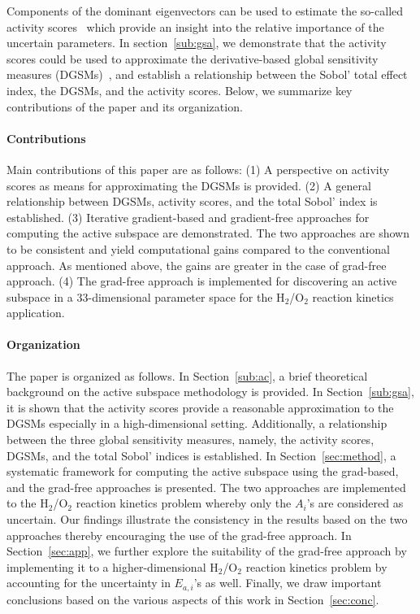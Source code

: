 Components of the dominant eigenvectors can be used to estimate the so-called 
activity scores~\cite{Diaz:2016,Constantine:2017} which provide an insight into the relative importance
of the uncertain parameters. In 
section~\ref{sub:gsa}, we demonstrate that the activity scores could be used to approximate the 
derivative-based global sensitivity measures (DGSMs)~\cite{Sobol:2009}, and establish a relationship between
the Sobol' total effect index, the DGSMs, and the activity scores. Below, we summarize key contributions of
the paper and its organization. 

\paragraph{Contributions}
Main contributions of this paper are as follows: (1) A perspective on activity scores as means for approximating
the DGSMs is provided. (2) A general relationship between DGSMs, activity scores, and the total Sobol' index 
is established. (3) Iterative gradient-based and gradient-free approaches for computing the active subspace are
 demonstrated. The two approaches are shown to be consistent and yield computational gains compared to the 
 conventional approach. As mentioned above, the gains are greater in the case of grad-free approach. (4) The
 grad-free approach is implemented for discovering an active subspace in a 33-dimensional parameter space 
 for the H$_2$/O$_2$ reaction kinetics application. 
 
 \paragraph{Organization}
 The paper is organized as follows. In Section~\ref{sub:ac}, a brief theoretical background on
 the active subspace methodology is provided. In Section~\ref{sub:gsa}, it is shown that the activity
 scores provide a reasonable approximation to the DGSMs especially in a high-dimensional setting. 
 Additionally, a relationship between the three global sensitivity measures, namely, the activity scores,
 DGSMs, and the total Sobol' indices is established. In Section~\ref{sec:method}, a systematic framework
 for computing the active subspace using the grad-based, and the grad-free approaches is presented. 
The two approaches are implemented to the H$_2$/O$_2$ reaction kinetics problem whereby only
the $A_i$'s are considered as uncertain. Our findings illustrate the consistency in the results based on
the two approaches thereby encouraging the use of the grad-free approach. In Section~\ref{sec:app},
we further explore the suitability of the grad-free approach by implementing it to a higher-dimensional
H$_2$/O$_2$ reaction kinetics problem by accounting for the uncertainty in $E_{a,i}$'s as well. 
Finally, we draw important conclusions based on the various aspects of this work in Section~\ref{sec:conc}.










 




